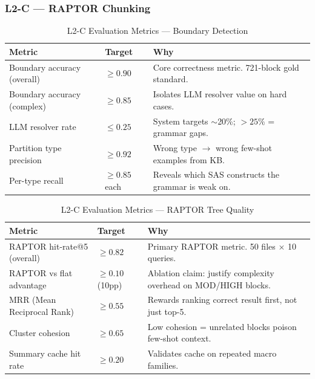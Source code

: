 \documentclass[11pt,a4paper]{article}
\begin{document}
\subsubsection{L2-C — RAPTOR Chunking}

\begin{table}[H]
\centering
\caption{L2-C Evaluation Metrics — Boundary Detection}
\renewcommand{\arraystretch}{1.25}
\small
\begin{tabularx}{\textwidth}{@{} L{4cm} l X @{}}
\toprule
\textbf{Metric} & \textbf{Target} & \textbf{Why} \\
\midrule
Boundary accuracy (overall) & $\geq 0.90$ & Core correctness metric. 721-block gold standard. \\
Boundary accuracy (complex) & $\geq 0.85$ & Isolates LLM resolver value on hard cases. \\
LLM resolver rate & $\leq 0.25$ & System targets $\sim$20\%; $> 25\%$ = grammar gaps. \\
Partition type precision & $\geq 0.92$ & Wrong type $\to$ wrong few-shot examples from KB. \\
Per-type recall & $\geq 0.85$ each & Reveals which SAS constructs the grammar is weak on. \\
\bottomrule
\end{tabularx}
\end{table}

\begin{table}[H]
\centering
\caption{L2-C Evaluation Metrics — RAPTOR Tree Quality}
\renewcommand{\arraystretch}{1.25}
\small
\begin{tabularx}{\textwidth}{@{} L{4cm} l X @{}}
\toprule
\textbf{Metric} & \textbf{Target} & \textbf{Why} \\
\midrule
RAPTOR hit-rate@5 (overall) & $\geq 0.82$ & Primary RAPTOR metric. 50 files $\times$ 10 queries. \\
RAPTOR vs flat advantage & $\geq 0.10$ (10pp) & Ablation claim: justify complexity overhead on MOD/HIGH blocks. \\
MRR (Mean Reciprocal Rank) & $\geq 0.55$ & Rewards ranking correct result first, not just top-5. \\
Cluster cohesion & $\geq 0.65$ & Low cohesion = unrelated blocks poison few-shot context. \\
Summary cache hit rate & $\geq 0.20$ & Validates cache on repeated macro families. \\
\bottomrule
\end{tabularx}
\end{table}
\end{document}
